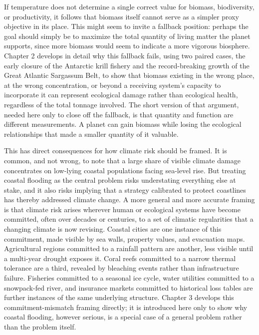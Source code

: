 \documentclass[11pt,oneside]{book}
\begin{document}
If temperature does not determine a single correct value for biomass, biodiversity, or productivity, it follows that biomass itself cannot serve as a simpler proxy objective in its place. This might seem to invite a fallback position: perhaps the goal should simply be to maximize the total quantity of living matter the planet supports, since more biomass would seem to indicate a more vigorous biosphere. Chapter 2 develops in detail why this fallback fails, using two paired cases, the early closure of the Antarctic krill fishery and the record-breaking growth of the Great Atlantic Sargassum Belt, to show that biomass existing in the wrong place, at the wrong concentration, or beyond a receiving system's capacity to incorporate it can represent ecological damage rather than ecological health, regardless of the total tonnage involved. The short version of that argument, needed here only to close off the fallback, is that quantity and function are different measurements. A planet can gain biomass while losing the ecological relationships that made a smaller quantity of it valuable.

This has direct consequences for how climate risk should be framed. It is common, and not wrong, to note that a large share of visible climate damage concentrates on low-lying coastal populations facing sea-level rise. But treating coastal flooding as the central problem risks understating everything else at stake, and it also risks implying that a strategy calibrated to protect coastlines has thereby addressed climate change. A more general and more accurate framing is that climate risk arises wherever human or ecological systems have become committed, often over decades or centuries, to a set of climatic regularities that a changing climate is now revising. Coastal cities are one instance of this commitment, made visible by sea walls, property values, and evacuation maps. Agricultural regions committed to a rainfall pattern are another, less visible until a multi-year drought exposes it. Coral reefs committed to a narrow thermal tolerance are a third, revealed by bleaching events rather than infrastructure failure. Fisheries committed to a seasonal ice cycle, water utilities committed to a snowpack-fed river, and insurance markets committed to historical loss tables are further instances of the same underlying structure. Chapter 3 develops this commitment-mismatch framing directly; it is introduced here only to show why coastal flooding, however serious, is a special case of a general problem rather than the problem itself.
\end{document}
